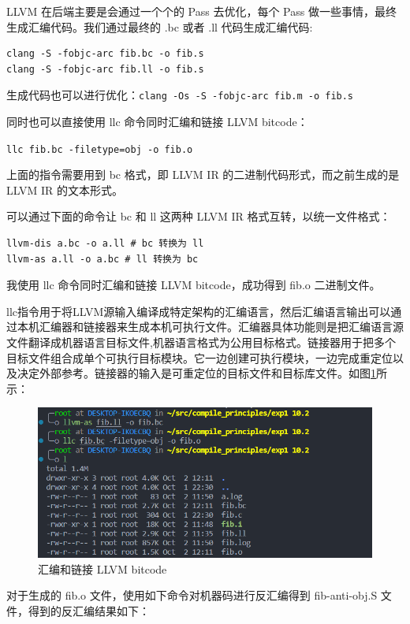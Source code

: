 \documentclass[UTF8,a4paper,10pt]{ctexart}
\begin{document}
LLVM 在后端主要是会通过一个个的 Pass 去优化，每个 Pass 做一些事情，最终生成汇编代码。我们通过最终的 .bc 或者 .ll 代码生成汇编代码:
\begin{verbatim}
clang -S -fobjc-arc fib.bc -o fib.s
clang -S -fobjc-arc fib.ll -o fib.s
\end{verbatim}

生成代码也可以进行优化：\verb|clang -Os -S -fobjc-arc fib.m -o fib.s|

同时也可以直接使用 llc 命令同时汇编和链接 LLVM bitcode：

\verb|llc fib.bc -filetype=obj -o fib.o|

上面的指令需要用到 bc 格式，即 LLVM IR 的二进制代码形式，而之前生成的是 LLVM IR 的文本形式。

可以通过下面的命令让 bc 和 ll 这两种 LLVM IR 格式互转，以统一文件格式：

\begin{verbatim}
llvm-dis a.bc -o a.ll # bc 转换为 ll
llvm-as a.ll -o a.bc # ll 转换为 bc
\end{verbatim}

我使用 llc 命令同时汇编和链接 LLVM bitcode，成功得到 fib.o 二进制文件。

llc指令用于将LLVM源输入编译成特定架构的汇编语言，然后汇编语言输出可以通过本机汇编器和链接器来生成本机可执行文件。汇编器具体功能则是把汇编语言源文件翻译成机器语言目标文件,机器语言格式为公用目标格式。链接器用于把多个目标文件组合成单个可执行目标模块。它一边创建可执行模块，一边完成重定位以及决定外部参考。链接器的输入是可重定位的目标文件和目标库文件。如图\ref{pic:6}所示：

\begin{figure}[H]
  \centering
  \includegraphics[width=\textwidth]{figure/output.png}
  \caption{汇编和链接 LLVM bitcode}
  \label{pic:6}
\end{figure}

对于生成的 fib.o 文件，使用如下命令对机器码进行反汇编得到 fib-anti-obj.S 文件，得到的反汇编结果如下：
\end{document}
